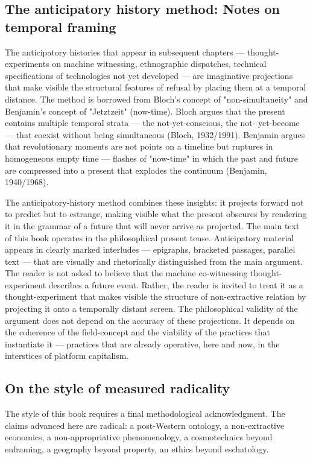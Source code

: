 \subsection{The anticipatory history method: Notes on temporal framing}

The anticipatory histories that appear in subsequent chapters — thought-experiments on machine witnessing, ethnographic dispatches, technical specifications of technologies not yet developed — are imaginative projections that make visible the structural features of refusal by placing them at a temporal distance. The method is borrowed from Bloch's concept of "non-simultaneity" and Benjamin's concept of "Jetztzeit" (now-time). Bloch argues that the present contains multiple temporal strata — the not-yet-conscious, the not- yet-become — that coexist without being simultaneous (Bloch, 1932/1991). Benjamin argues that revolutionary moments are not points on a timeline but ruptures in homogeneous empty time — flashes of "now-time" in which the past and future are compressed into a present that explodes the continuum (Benjamin, 1940/1968).

The anticipatory-history method combines these insights: it projects forward not to predict but to estrange, making visible what the present obscures by rendering it in the grammar of a future that will never arrive as projected. The main text of this book operates in the philosophical present tense. Anticipatory material appears in clearly marked interludes — epigraphs, bracketed passages, parallel text — that are visually and rhetorically distinguished from the main argument. The reader is not asked to believe that the machine co-witnessing thought-experiment describes a future event. Rather, the reader is invited to treat it as a thought-experiment that makes visible the structure of non-extractive relation by projecting it onto a temporally distant screen. The philosophical validity of the argument does not depend on the accuracy of these projections. It depends on the coherence of the field-concept and the viability of the practices that instantiate it — practices that are already operative, here and now, in the interstices of platform capitalism.

\subsection{On the style of measured radicality}

The style of this book requires a final methodological acknowledgment. The claims advanced here are radical: a post-Western ontology, a non-extractive economics, a non-appropriative phenomenology, a cosmotechnics beyond enframing, a geography beyond property, an ethics beyond eschatology.

